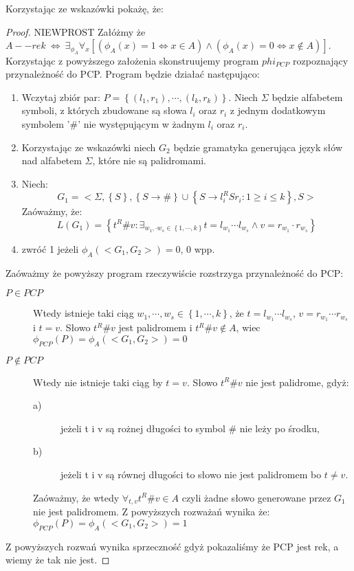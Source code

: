 \documentclass[svgnames]{report}
\begin{document}
Korzystając ze wskazówki  pokażę, że: 
\begin{proof}
NIEWPROST
Załóżmy że $A -- rek \ \Leftrightarrow \ \exists_{\phi_A} \forall_x [(\phi_A(x) = 1 \Leftrightarrow x \in A) \wedge (\phi_A(x) = 0 \Leftrightarrow x \not\in A)]$.
Korzystając z powyższego założenia skonstruujemy program $phi_{PCP}$ rozpoznający przynależność do PCP.
Program będzie działać następująco:
\begin{enumerate}
	\item Wczytaj zbiór par: $P = \left\{ (l_1, r_1), \cdots, (l_k, r_k) \right\}$. Niech $\Sigma$ będzie alfabetem symboli, z których zbudowane są słowa $l_i$ oraz $r_i$ z jednym dodatkowym symbolem '\#' nie występującym w żadnym $l_i$ oraz $r_i$.
	\item Korzystając ze wskazówki niech $G_2$ będzie gramatyka generująca język słów nad alfabetem $\Sigma$, które nie są palidromami.
	\item Niech:
		\begin{equation*}
			G_1 = <\Sigma, \left\{ S \right\}, \left\{ S \rightarrow \# \right\} \cup \left\{ S \rightarrow l_i^R S r_i : 1 \geqslant i \leqslant k \right\}, S>
		\end{equation*}
	Zaóważmy, że: 
	\begin{equation*}
		L(G_1) = \left\{ t^R\#v : \exists_{w_1, \cdot w_s \in \left\{ 1, \cdots, k \right\} }t = l_{w_1} \cdots l_{w_s} \wedge v = r_{w_1} \cdot r_{w_s} \right\}
	\end{equation*}
	\item zwróć 1 jeżeli $\phi_A(<G_1, G_2>) = 0$, 0 wpp.
\end{enumerate}

Zaóważmy że powyższy program rzeczywiście rozstrzyga przynależność do PCP:
\begin{description}
	\item[$P \in PCP$]
		Wtedy istnieje taki ciąg $w_1, \cdots, w_s \in \left\{ 1, \cdots, k \right\}$, że $t = l_{w_1} \cdots l_{w_s}$, $v = r_{w_1} \cdots r_{w_s}$ i $t=v$.
		Słowo $t^R\#v$ jest palidromem i $t^R\#v \not\in A$, wiec $\phi_{PCP}(P) = \phi_A(<G_1, G_2>) = 0$
	\item[$P \not\in PCP$]		
		Wtedy nie istnieje taki ciąg by $t = v$.
		Słowo $t^R\#v$ nie jest palidrome, gdyż:
		\begin{description}
			\item[a)] jeżeli t i v są rożnej długości to symbol \# nie leży po środku,
			\item[b)] jeżeli t i v są równej długości to słowo nie jest palidromem bo $t \not= v$.
		\end{description}
		Zaóważmy, że wtedy $\forall_{t,v} t^R\#v \in A$ czyli żadne słowo generowane przez $G_1$ nie jest palidromem.
		Z powyższych rozważań wynika że: $\phi_{PCP}(P) = \phi_A(<G_1, G_2>) = 1$
\end{description}

Z powyższych rozwań wynika sprzeczność gdyż pokazaliśmy że PCP jest rek, a wiemy że tak nie jest.

\end{proof}
\end{document}
